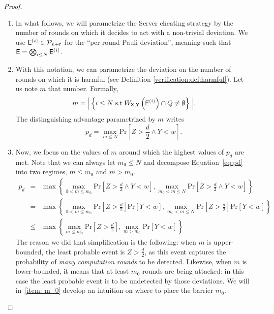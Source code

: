 \begin{proof}
\begin{enumerate}[label=\arabic*)]
    \item
    In what follows, we will parametrize the Server cheating strategy by the number of rounds on which it decides to act with a non-trivial deviation.
    We use $\mathsf{E}^{(i)}\in\mathcal{P}_{n+t}$ for the ``per-round Pauli deviation'', meaning such that $\mathsf{E}=\bigotimes_{i\leq N}\mathsf{E}^{(i)}$.
    \item
    With this notation, we can parametrize the deviation on the number of rounds on which it is harmful (see Definition \ref{verification:def:harmful}).
    Let us note $m$ that number. Formally, $$
    m=
    \Big|\left\{ i\leq N \; \text{s.t}\;  W_{\mathsf{X},\mathsf{Y}}\left( \mathsf{E}^{(i)} \right)\cap Q\neq \emptyset  \right\}\Big|
    .$$ The distinguishing advantage parametrized by $m$ writes
    \begin{equation}
        \label{eq:pd}
        p_d = \max_{m\leq N} \mathrm{Pr}\left[Z > \frac{d}{2} \wedge Y<w\right].
    \end{equation}
    \item
    Now, we focus on the values of $m$ around which the highest values of $p_d$ are met.
    Note that we can always let $m_0\leq N$ and decompose Equation~\ref{eq:pd} into two regimes, $m\leq m_0$ and $m>m_0$.
    \begin{eqnarray}
        \label{eq:pd_dec}
        p_d
        &=& \max
        \left\{
            \max_{0< m\leq m_0}\mathrm{Pr}\left[Z > \frac{d}{2} \wedge Y<w\right],
            \max_{m_0 < m \leq N}\mathrm{Pr}\left[Z > \frac{d}{2} \wedge Y<w\right]
         \right\}
         \\
        &=& \max
        \left\{
            \max_{0< m\leq m_0}\mathrm{Pr}\left[Z > \frac{d}{2}\right] \mathrm{Pr} [Y<w],
            \max_{m_0 < m \leq N}\mathrm{Pr}\left[Z > \frac{d}{2}\right] \mathrm{Pr} [Y<w]
         \right\}
         \\
        &\leq& \max
        \left\{
            \max_{m\leq m_0}\mathrm{Pr}\left[Z > \frac{d}{2}\right] ,
            \max_{m> m_0} \mathrm{Pr} [Y<w]
         \right\}
    \end{eqnarray}
    The reason we did that simplification is the following: when $m$ is upper-bounded, the least probable event is $Z>\frac{d}{2}$, as this event captures the probability of \textit{many computation rounds} to be detected.
    Likewise, when $m$ is lower-bounded, it means that at least $m_0$ rounds are being attacked: in this case the least probable event is to be undetected by those deviations.
    We will in~\ref{item: m_0} develop an intuition on where to place the barrier $m_0$.

\end{enumerate}
\end{proof}
